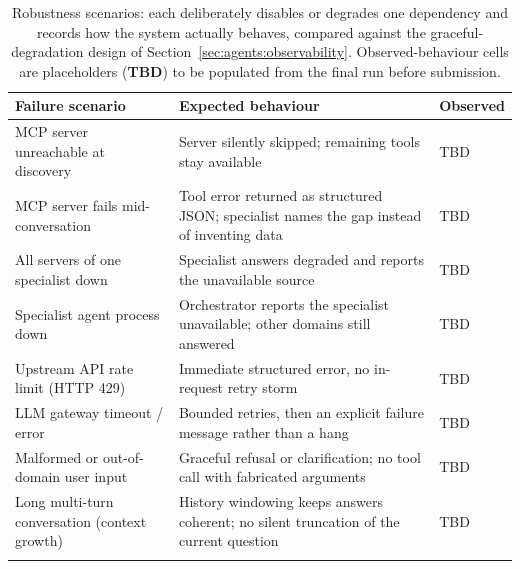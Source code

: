 \begin{table}[ht]
\begin{center}
\begin{minipage}{\textwidth}
\caption[Robustness and failure test scenarios (placeholder)]{Robustness scenarios: each deliberately disables or degrades one dependency and records how the system actually behaves, compared against the graceful-degradation design of Section~\ref{sec:agents:observability}. Observed-behaviour cells are placeholders (\textbf{TBD}) to be populated from the final run before submission.}\label{tab:robustness}
\begin{tabularx}{\textwidth}{XXl}
\toprule
\textbf{Failure scenario} & \textbf{Expected behaviour} & \textbf{Observed} \\
\midrule
MCP server unreachable at discovery & Server silently skipped; remaining tools stay available & TBD \\
\addlinespace
MCP server fails mid-conversation & Tool error returned as structured JSON; specialist names the gap instead of inventing data & TBD \\
\addlinespace
All servers of one specialist down & Specialist answers degraded and reports the unavailable source & TBD \\
\addlinespace
Specialist agent process down & Orchestrator reports the specialist unavailable; other domains still answered & TBD \\
\addlinespace
Upstream API rate limit (HTTP 429) & Immediate structured error, no in-request retry storm & TBD \\
\addlinespace
LLM gateway timeout / error & Bounded retries, then an explicit failure message rather than a hang & TBD \\
\addlinespace
Malformed or out-of-domain user input & Graceful refusal or clarification; no tool call with fabricated arguments & TBD \\
\addlinespace
Long multi-turn conversation (context growth) & History windowing keeps answers coherent; no silent truncation of the current question & TBD \\
\botrule
\end{tabularx}
\end{minipage}
\end{center}
\end{table}
